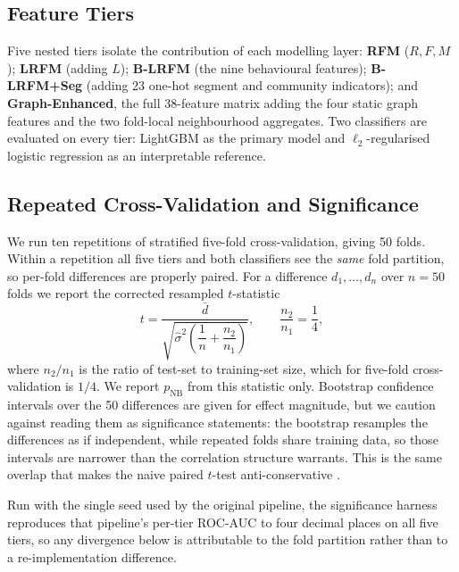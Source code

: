 \documentclass[runningheads]{llncs}
\begin{document}
\subsection{Feature Tiers}

Five nested tiers isolate the contribution of each modelling layer:
\textbf{RFM} ($R, F, M$); \textbf{LRFM} (adding $L$); \textbf{B-LRFM} (the nine
behavioural features); \textbf{B-LRFM+Seg} (adding 23 one-hot segment and
community indicators); and \textbf{Graph-Enhanced}, the full 38-feature matrix
adding the four static graph features and the two fold-local neighbourhood
aggregates. Two classifiers are evaluated on every tier: LightGBM
\cite{ke2017lightgbm} as the primary model and $\ell_2$-regularised logistic
regression as an interpretable reference.

\subsection{Repeated Cross-Validation and Significance}
\label{sec:sig}

We run ten repetitions of stratified five-fold cross-validation, giving 50 folds.
Within a repetition all five tiers and both classifiers see the \emph{same} fold
partition, so per-fold differences are properly paired. For a difference
$d_1, \dots, d_n$ over $n = 50$ folds we report the corrected resampled
$t$-statistic \cite{nadeau2003inference}
\begin{equation}
t = \frac{\bar{d}}
{\sqrt{\hat{\sigma}^{2}\left(\dfrac{1}{n} + \dfrac{n_{2}}{n_{1}}\right)}},
\qquad \frac{n_{2}}{n_{1}} = \frac{1}{4},
\end{equation}
where $n_{2}/n_{1}$ is the ratio of test-set to training-set size, which for
five-fold cross-validation is $1/4$. We report $p_{\mathrm{NB}}$ from this
statistic only. Bootstrap confidence intervals over the 50 differences are given
for effect magnitude, but we caution against reading them as significance
statements: the bootstrap resamples the differences as if independent, while
repeated folds share training data, so those intervals are narrower than the
correlation structure warrants. This is the same overlap that makes the naive
paired $t$-test anti-conservative \cite{dietterich1998approximate}.

Run with the single seed used by the original pipeline, the significance harness
reproduces that pipeline's per-tier ROC-AUC to four decimal places on all five
tiers, so any divergence below is attributable to the fold partition rather than
to a re-implementation difference.
\end{document}
